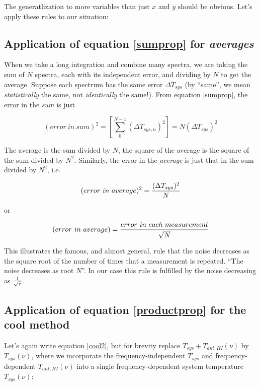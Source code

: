 \documentclass[preprint]{aastex}
\begin{document}
\noindent The generatlization to more variables than just $x$ and $y$
should be obvious. Let's apply these rules to our situation:

\subsection{ Application of equation \ref{sumprop} for {\it averages}}

	When we take a long integration and combine many spectra, we are
taking the sum of $N$ spectra, each with its independent error, and
dividing by $N$ to get the average. Suppose each spectrum has the same
error $\Delta T_{sys}$ (by ``same'', we mean {\it statistically} the
same, not {\it identically} the same!). From equation \ref{sumprop},
the error in the {\it sum} is just

\begin{mathletters}
\begin{equation}
(error \ in \ sum)^2 = \left[ \sum_0^{N-1} (\Delta T_{sys,n})^2 \right]
=	N (\Delta T_{sys})^2
\end{equation}

\noindent The average is the sum divided by $N$, the square of the
average is the square of the sum divided by $N^2$. Similarly, the error
in the {\it average} is just that in the sum divided by $N^2$, i.e.

\begin{equation} 
(error \ in \ average)^2 = {(\Delta T_{sys})^2 \over N}
\end{equation}
 
\noindent or

\begin{equation} 
(error \ in \ average) = { error \ in \ each \ measurement  \over \sqrt{N}}
\end{equation}
\end{mathletters}

	This illustrates the famous, and almost general, rule that the
noise decreases as the square root of the number of times that a
measurement is repeated. ``The noise decreases as root $N$''. In our
case this rule is fulfilled by the noise decreasing as $1 \over
\sqrt{\tau}$. 

\subsection{ Application of equation \ref{productprop} for the cool
method}

	Let's again write equation \ref{cool2}, but for brevity replace 
$T_{sys} + T_{ant, HI}(\nu)$ by $T_{sys}(\nu)$, where we incorporate the
frequency-independent $T_{sys}$ and frequency-dependent $T_{ant,
HI}(\nu)$ into a single frequency-dependent system temperature
$T_{sys}(\nu)$: 
\end{document}
